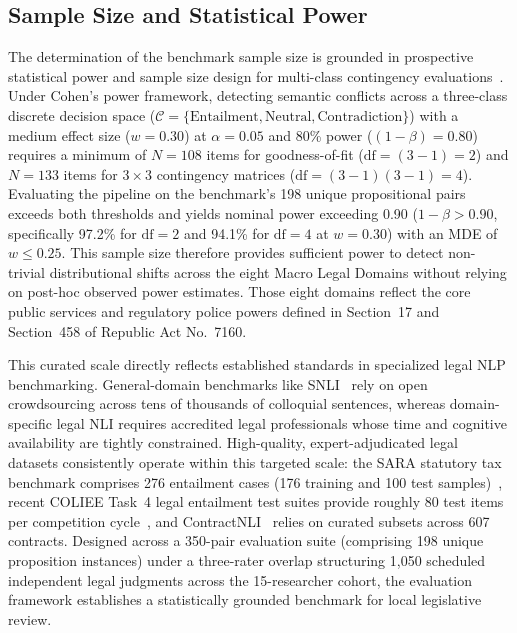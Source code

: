     \subsection{Sample Size and Statistical Power}
    \label{sec:sample_size_power}
    The determination of the benchmark sample size is grounded in prospective statistical power and sample size design for multi-class contingency evaluations~\cite{cohen1988statistical, faul2007gpower}. Under Cohen's power framework, detecting semantic conflicts across a three-class discrete decision space ($\mathcal{C} = \{\text{Entailment}, \text{Neutral}, \text{Contradiction}\}$) with a medium effect size ($w = 0.30$) at $\alpha = 0.05$ and 80\% power ($(1 - \beta) = 0.80$) requires a minimum of $N = 108$ items for goodness-of-fit ($\text{df} = (3-1) = 2$) and $N = 133$ items for $3 \times 3$ contingency matrices ($\text{df} = (3-1)(3-1) = 4$). Evaluating the pipeline on the benchmark's 198 unique propositional pairs exceeds both thresholds and yields nominal power exceeding 0.90 ($1 - \beta > 0.90$, specifically 97.2\% for $\text{df}=2$ and 94.1\% for $\text{df}=4$ at $w=0.30$) with an MDE of $w \le 0.25$. This sample size therefore provides sufficient power to detect non-trivial distributional shifts across the eight Macro Legal Domains without relying on post-hoc observed power estimates. Those eight domains reflect the core public services and regulatory police powers defined in Section~17 and Section~458 of Republic Act No.~7160.

    This curated scale directly reflects established standards in specialized legal NLP benchmarking. General-domain benchmarks like SNLI~\cite{bowman2015snli} rely on open crowdsourcing across tens of thousands of colloquial sentences, whereas domain-specific legal NLI requires accredited legal professionals whose time and cognitive availability are tightly constrained. High-quality, expert-adjudicated legal datasets consistently operate within this targeted scale: the SARA statutory tax benchmark comprises 276 entailment cases (176 training and 100 test samples)~\cite{holzenberger2020a}, recent COLIEE Task~4 legal entailment test suites provide roughly 80 test items per competition cycle~\cite{rabelo2022coliee, alshehri2026cross}, and ContractNLI~\cite{koreeda2021contract} relies on curated subsets across 607 contracts. Designed across a 350-pair evaluation suite (comprising 198 unique proposition instances) under a three-rater overlap structuring 1,050 scheduled independent legal judgments across the 15-researcher cohort, the evaluation framework establishes a statistically grounded benchmark for local legislative review.

